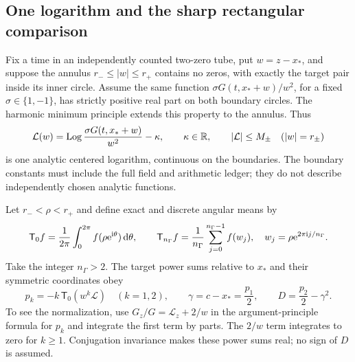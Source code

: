 \subsection{One logarithm and the sharp rectangular comparison}

Fix a time in an independently counted two-zero tube, put $w=z-x_*$,
and suppose the annulus $r_-\le|w|\le r_+$ contains no zeros, with
exactly the target pair inside its inner circle. Assume the same function
$\sigma G(t,x_*+w)/w^2$, for a fixed $\sigma\in\{1,-1\}$, has
strictly positive real part on both boundary circles. The harmonic
minimum principle extends this property to the annulus. Thus
\begin{equation}
 \mathcal L(w)=\operatorname{Log}\frac{\sigma G(t,x_*+w)}{w^2}-\kappa,
 \qquad \kappa\in\mathbb R,
 \qquad |\mathcal L|\le M_\pm\quad(|w|=r_\pm)
 \label{ce:annular-log}
\end{equation}
is one analytic centered logarithm, continuous on the boundaries. The
boundary constants must include the full field and arithmetic ledger;
they do not describe independently chosen analytic functions.

Let $r_-<\rho<r_+$ and define exact and discrete angular means by
\begin{equation}
 \mathsf T_0 f=\frac1{2\pi}\int_0^{2\pi}f(\rho\mathrm e^{\mathrm i\theta})\,\mathrm d\theta,
 \qquad
 \mathsf T_{n_\Gamma}f=
 \frac1{n_\Gamma}\sum_{j=0}^{n_\Gamma-1}f(w_j),
 \quad w_j=\rho\mathrm e^{2\pi\mathrm i j/n_\Gamma}.
 \label{ce:means}
\end{equation}
Take the integer $n_\Gamma>2$. The target power sums relative to $x_*$
and their symmetric coordinates obey
\begin{equation}
 p_k=-k\,\mathsf T_0(w^k\mathcal L)\quad(k=1,2),
 \qquad \gamma=c-x_*=\frac{p_1}{2},\qquad
 D=\frac{p_2}{2}-\gamma^2.
 \label{ce:power-sums}
\end{equation}
To see the normalization, use $G_z/G=\mathcal L_z+2/w$ in the
argument-principle formula for $p_k$ and integrate the first term by
parts. The $2/w$ term integrates to zero for $k\ge1$.
Conjugation invariance makes these power sums real; no sign of $D$ is
assumed.

